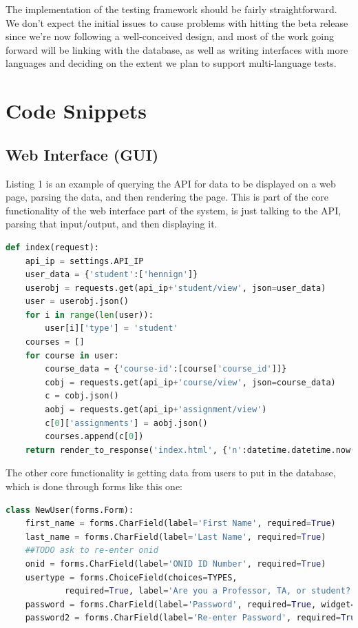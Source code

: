 \documentclass[10pt,draftclsnofoot,onecolumn]{IEEEtran}
\begin{document}
The implementation of the testing framework should be fairly straightforward.
We don’t expect the initial issues to cause problems with hitting the beta
release since we’re now following a well-conceived design, and most of the work
going forward will be linking with the database, as well as writing interfaces
with more languages and deciding on the extent we plan to support
multi-language tests.

\section{Code Snippets}
\subsection{Web Interface (GUI)}
Listing 1 is an example of querying the API for data to be displayed on a 
web page, parsing the data, and then rendering the page. This is part 
of the core functionality of the web interface part of the system, is 
just talking to the API, parsing that input/output, and then displaying it.
\begin{lstlisting}[language=Python, caption=View function for the index page]
def index(request):
	api_ip = settings.API_IP
	user_data = {'student':['hennign']}
	userobj = requests.get(api_ip+'student/view', json=user_data)
	user = userobj.json()
	for i in range(len(user)):
		user[i]['type'] = 'student'
	courses = []
	for course in user:
		course_data = {'course-id':[course['course_id']]}
		cobj = requests.get(api_ip+'course/view', json=course_data)
		c = cobj.json()
		aobj = requests.get(api_ip+'assignment/view')
		c[0]['assignments'] = aobj.json()
		courses.append(c[0])
	return render_to_response('index.html', {'n':datetime.datetime.now(), 'user':user[0], 'courses':courses})
\end{lstlisting}

The other core functionality is getting data from users to put in the database,
which is done through forms like this one:

\begin{lstlisting}[language=Python, caption=Example of a form]
class NewUser(forms.Form):
	first_name = forms.CharField(label='First Name', required=True)
	last_name = forms.CharField(label='Last Name', required=True)
	##TODO ask to re-enter onid
	onid = forms.CharField(label='ONID ID Number', required=True)
	usertype = forms.ChoiceField(choices=TYPES,
			required=True, label='Are you a Professor, TA, or student?')
	password = forms.CharField(label='Password', required=True, widget=forms.PasswordInput)
	password2 = forms.CharField(label='Re-enter Password', required=True, widget=forms.PasswordInput)
\end{lstlisting}
\end{document}
